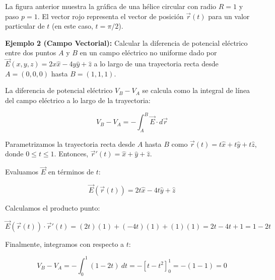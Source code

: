 \documentclass{article}
\begin{document}
\begin{center}
\end{center}

La figura anterior muestra la gráfica de una hélice circular con radio $R=1$ y paso $p=1$. El vector rojo representa el vector de posición $\vec{r}(t)$ para un valor particular de $t$ (en este caso, $t=\pi/2$).


\textbf{Ejemplo 2 (Campo Vectorial):}
Calcular la diferencia de potencial eléctrico entre dos puntos $A$ y $B$ en un campo eléctrico no uniforme dado por $\vec{E}(x, y, z) = 2x\hat{x} - 4y\hat{y} + \hat{z}$ a lo largo de una trayectoria recta desde $A = (0, 0, 0)$ hasta $B = (1, 1, 1)$.

La diferencia de potencial eléctrico $V_B - V_A$ se calcula como la integral de línea del campo eléctrico a lo largo de la trayectoria:

\[
V_B - V_A = -\int_A^B \vec{E} \cdot d\vec{r}
\]

Parametrizamos la trayectoria recta desde $A$ hasta $B$ como $\vec{r}(t) = t\hat{x} + t\hat{y} + t\hat{z}$, donde $0 \le t \le 1$. Entonces, $\vec{r}'(t) = \hat{x} + \hat{y} + \hat{z}$.

Evaluamos $\vec{E}$ en términos de $t$:

\[
\vec{E}(\vec{r}(t)) = 2t\hat{x} - 4t\hat{y} + \hat{z}
\]

Calculamos el producto punto:

\[
\vec{E}(\vec{r}(t)) \cdot \vec{r}'(t) = (2t)(1) + (-4t)(1) + (1)(1) = 2t - 4t + 1 = 1 - 2t
\]

Finalmente, integramos con respecto a $t$:

\[
V_B - V_A = -\int_0^1 (1 - 2t) \ dt = -[t - t^2]_0^1 = -(1 - 1) = 0
\]
\end{document}
